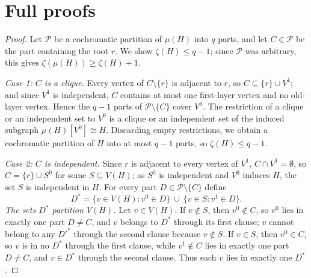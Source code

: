 \documentclass[11pt,a4paper]{article}
\theoremstyle{plain}
\theoremstyle{definition}
\theoremstyle{remark}
\newcommand{\myc}{\mu}
\newcommand{\cP}{\mathcal P}
\begin{document}
\appendix

\section{Full proofs}\label{app:proofs}

\label{pf:coch}
\lemcoch*
\begin{proof}
Let $\cP$ be a cochromatic partition of $\myc(H)$ into $q$ parts, and let $C\in\cP$ be the part containing the root $r$. We show $\zeta(H)\le q-1$; since $\cP$ was arbitrary, this gives $\zeta(\myc(H))\ge\zeta(H)+1$.

\emph{Case 1: $C$ is a clique.} Every vertex of $C\setminus\{r\}$ is adjacent to $r$, so $C\subseteq\{r\}\cup V^1$; and since $V^1$ is independent, $C$ contains at most one first-layer vertex and no old-layer vertex. Hence the $q-1$ parts of $\cP\setminus\{C\}$ cover $V^0$. The restriction of a clique or an independent set to $V^0$ is a clique or an independent set of the induced subgraph $\myc(H)[V^0]\cong H$. Discarding empty restrictions, we obtain a cochromatic partition of $H$ into at most $q-1$ parts, so $\zeta(H)\le q-1$.

\emph{Case 2: $C$ is independent.} Since $r$ is adjacent to every vertex of $V^1$, $C\cap V^1=\emptyset$, so $C=\{r\}\cup S^0$ for some $S\subseteq V(H)$; as $S^0$ is independent and $V^0$ induces $H$, the set $S$ is independent in $H$. For every part $D\in\cP\setminus\{C\}$ define
\[
D^*=\{v\in V(H): v^0\in D\}\ \cup\ \{v\in S: v^1\in D\}.
\]
\emph{The sets $D^*$ partition $V(H)$.} Let $v\in V(H)$. If $v\notin S$, then $v^0\notin C$, so $v^0$ lies in exactly one part $D\ne C$, and $v$ belongs to $D^*$ through its first clause; $v$ cannot belong to any $D'^*$ through the second clause because $v\notin S$. If $v\in S$, then $v^0\in C$, so $v$ is in no $D^*$ through the first clause, while $v^1\notin C$ lies in exactly one part $D\ne C$, and $v\in D^*$ through the second clause. Thus each $v$ lies in exactly one $D^*$.


\end{proof}
\end{document}
